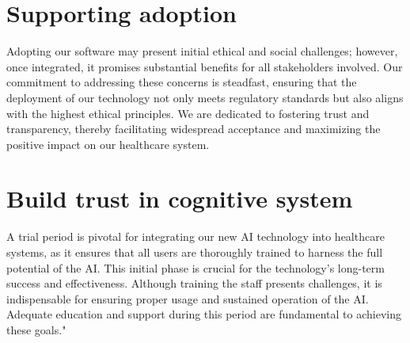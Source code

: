 \documentclass{article}
\begin{document}
\section{Supporting adoption}
Adopting our software may present initial ethical and social challenges; however, once integrated, it promises substantial benefits for all stakeholders involved. Our commitment to addressing these concerns is steadfast, ensuring that the deployment of our technology not only meets regulatory standards but also aligns with the highest ethical principles. We are dedicated to fostering trust and transparency, thereby facilitating widespread acceptance and maximizing the positive impact on our healthcare system.


\section{Build trust in cognitive system}
A trial period is pivotal for integrating our new AI technology into healthcare systems, as it ensures that all users are thoroughly trained to harness the full potential of the AI. This initial phase is crucial for the technology’s long-term success and effectiveness. Although training the staff presents challenges, it is indispensable for ensuring proper usage and sustained operation of the AI. Adequate education and support during this period are fundamental to achieving these goals."
\end{document}
